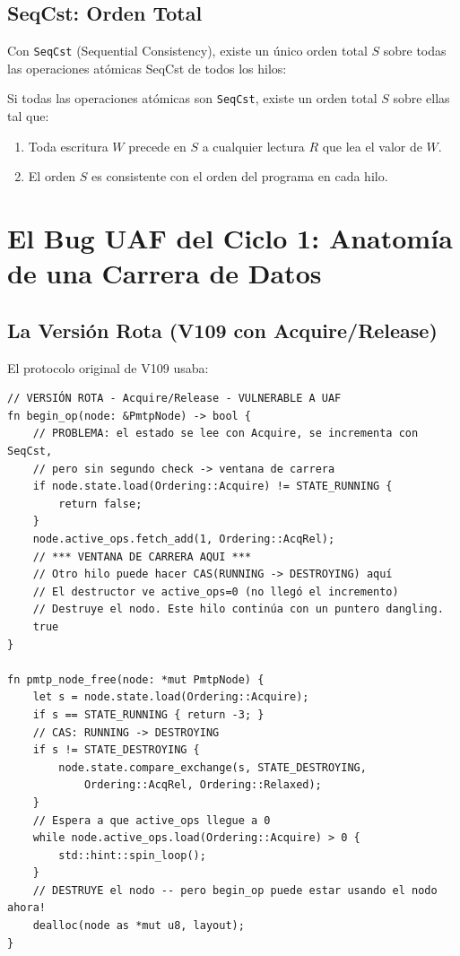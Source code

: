 \subsection{SeqCst: Orden Total}

Con \texttt{SeqCst} (Sequential Consistency), existe un único orden total $S$ sobre
todas las operaciones atómicas SeqCst de todos los hilos:

\begin{theorem}
\label{thm:seqcst}
Si todas las operaciones atómicas son \texttt{SeqCst}, existe un orden total $S$
sobre ellas tal que:
\begin{enumerate}
\item Toda escritura $W$ precede en $S$ a cualquier lectura $R$ que lea el valor de $W$.
\item El orden $S$ es consistente con el orden del programa en cada hilo.
\end{enumerate}
\end{theorem}

\section{El Bug UAF del Ciclo 1: Anatomía de una Carrera de Datos}

\subsection{La Versión Rota (V109 con Acquire/Release)}

El protocolo original de V109 usaba:

\begin{lstlisting}[style=ruststyle, caption={Protocolo UAF (ROTO --- V109 original)}, label=lst:uaf_bug]
// VERSIÓN ROTA - Acquire/Release - VULNERABLE A UAF
fn begin_op(node: &PmtpNode) -> bool {
    // PROBLEMA: el estado se lee con Acquire, se incrementa con SeqCst,
    // pero sin segundo check -> ventana de carrera
    if node.state.load(Ordering::Acquire) != STATE_RUNNING {
        return false;
    }
    node.active_ops.fetch_add(1, Ordering::AcqRel);
    // *** VENTANA DE CARRERA AQUI ***
    // Otro hilo puede hacer CAS(RUNNING -> DESTROYING) aquí
    // El destructor ve active_ops=0 (no llegó el incremento)
    // Destruye el nodo. Este hilo continúa con un puntero dangling.
    true
}

fn pmtp_node_free(node: *mut PmtpNode) {
    let s = node.state.load(Ordering::Acquire);
    if s == STATE_RUNNING { return -3; }
    // CAS: RUNNING -> DESTROYING
    if s != STATE_DESTROYING {
        node.state.compare_exchange(s, STATE_DESTROYING, 
            Ordering::AcqRel, Ordering::Relaxed);
    }
    // Espera a que active_ops llegue a 0
    while node.active_ops.load(Ordering::Acquire) > 0 {
        std::hint::spin_loop();
    }
    // DESTRUYE el nodo -- pero begin_op puede estar usando el nodo ahora!
    dealloc(node as *mut u8, layout);
}
\end{lstlisting}

